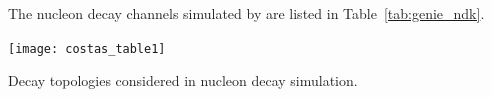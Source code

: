 The nucleon decay channels simulated by  are listed in Table~\ref{tab:genie_ndk}.

\begin{table}
  \texttt{[image: costas\_table1]}
  
  \caption[ nucleon decay topologies]{Decay topologies considered in  nucleon decay simulation.}
  \label{tab:genie_ndk}
\end{table}

%  



